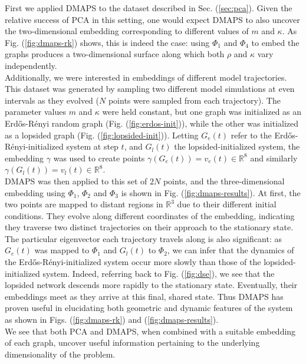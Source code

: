\documentclass[epjST, final]{svjour}
\begin{document}
\begin{onehalfspace}
First we applied DMAPS to the dataset described in
Sec. (\ref{sec:pca}). Given the relative success of PCA in this
setting, one would expect DMAPS to also uncover the two-dimensional
embedding corresponding to different values of $m$ and $\kappa$. As
Fig. (\ref{fig:dmaps-rk}) shows, this is indeed the case: using
$\Phi_1$ and $\Phi_4$ to embed the graphs produces a two-dimensional
surface along which both $\rho$ and $\kappa$ vary independently. \\

Additionally, we were interested in embeddings of different
model trajectories. This dataset was generated by sampling two
different model simulations at even intervals as they evolved ($N$
points were sampled from each trajectory). The parameter values $m$
and $\kappa$ were held constant, but one graph was initialized as an
Erd\H{o}s-R\'{e}nyi random graph (Fig. (\ref{fig:erdos-init})), while
the other was initialized as a lopsided graph
(Fig. (\ref{fig:lopsided-init})). Letting $G_e(t)$ refer to the
Erd\H{o}s-R\'{e}nyi-initialized system at step $t$, and $G_l(t)$ the
lopsided-initialized system, the embedding $\gamma$ was used to create
points $\gamma(G_e(t)) = v_e(t) \in \mathbb{R}^8$ and similarly
$\gamma(G_l(t)) = v_l(t) \in \mathbb{R}^8$. \\ 

DMAPS was then applied to this set of $2N$ points, and the
three-dimensional embedding using $\Phi_1$, $\Phi_2$ and $\Phi_3$ is
shown in Fig. (\ref{fig:dmaps-results}). At first, the two points are
mapped to distant regions in $\mathbb{R}^3$ due to their different
initial conditions. They evolve along different coordinates of
the embedding, indicating they traverse two distinct trajectories on
their approach to the stationary state. The particular eigenvector
each trajectory travels along is also significant: as $G_e(t)$ was
mapped to $\Phi_1$ and $G_l(t)$ to $\Phi_2$, we can infer that the
dynamics of the Erd\H{o}s-R\'{e}nyi-initialized system occur more
slowly than those of the lopsided-initialized system. Indeed,
referring back to Fig. (\ref{fig:dse}), we see that the lopsided
network descends more rapidly to the stationary state. Eventually,
their embeddings meet as they arrive at this final, shared state. Thus
DMAPS has proven useful in elucidating both geometric and dynamic
features of the system as shown in Figs. (\ref{fig:dmaps-rk}) and (\ref{fig:dmaps-results}). \\

We see that both PCA and DMAPS, when combined with a suitable
embedding of each graph, uncover useful information pertaining to the
underlying dimensionality of the problem.



\end{onehalfspace}
\end{document}
